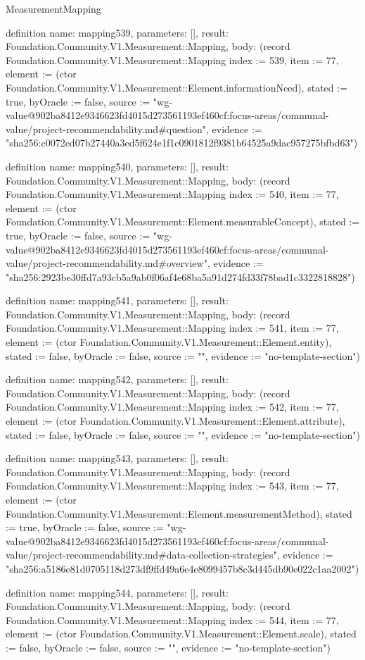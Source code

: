 \begin{lexlean}{MeasurementMapping}
\begin{semanticmodule}
definition{
  name: mapping539,
  parameters: [],
  result: Foundation.Community.V1.Measurement::Mapping,
  body: (record Foundation.Community.V1.Measurement::Mapping {index := 539, item := 77, element := (ctor Foundation.Community.V1.Measurement::Element.informationNeed), stated := true, byOracle := false, source := "wg-value@902ba8412e9346623fd4015d273561193ef460cf:focus-areas/communal-value/project-recommendability.md#question", evidence := "sha256:c0072ed07b27440a3ed5f624e1f1c0901812f9381b64525a9dac957275bfbd63"})
}

definition{
  name: mapping540,
  parameters: [],
  result: Foundation.Community.V1.Measurement::Mapping,
  body: (record Foundation.Community.V1.Measurement::Mapping {index := 540, item := 77, element := (ctor Foundation.Community.V1.Measurement::Element.measurableConcept), stated := true, byOracle := false, source := "wg-value@902ba8412e9346623fd4015d273561193ef460cf:focus-areas/communal-value/project-recommendability.md#overview", evidence := "sha256:2923be30ffd7a93cb5a9ab0f06af4e68ba5a91d274fd33f78bad1c3322818828"})
}

definition{
  name: mapping541,
  parameters: [],
  result: Foundation.Community.V1.Measurement::Mapping,
  body: (record Foundation.Community.V1.Measurement::Mapping {index := 541, item := 77, element := (ctor Foundation.Community.V1.Measurement::Element.entity), stated := false, byOracle := false, source := "", evidence := "no-template-section"})
}

definition{
  name: mapping542,
  parameters: [],
  result: Foundation.Community.V1.Measurement::Mapping,
  body: (record Foundation.Community.V1.Measurement::Mapping {index := 542, item := 77, element := (ctor Foundation.Community.V1.Measurement::Element.attribute), stated := false, byOracle := false, source := "", evidence := "no-template-section"})
}

definition{
  name: mapping543,
  parameters: [],
  result: Foundation.Community.V1.Measurement::Mapping,
  body: (record Foundation.Community.V1.Measurement::Mapping {index := 543, item := 77, element := (ctor Foundation.Community.V1.Measurement::Element.measurementMethod), stated := true, byOracle := false, source := "wg-value@902ba8412e9346623fd4015d273561193ef460cf:focus-areas/communal-value/project-recommendability.md#data-collection-strategies", evidence := "sha256:a5186e81d0705118d273df9ffd49a6e4e8099457b8c3d445db90e022c1aa2002"})
}

definition{
  name: mapping544,
  parameters: [],
  result: Foundation.Community.V1.Measurement::Mapping,
  body: (record Foundation.Community.V1.Measurement::Mapping {index := 544, item := 77, element := (ctor Foundation.Community.V1.Measurement::Element.scale), stated := false, byOracle := false, source := "", evidence := "no-template-section"})
}


\end{semanticmodule}
\end{lexlean}

